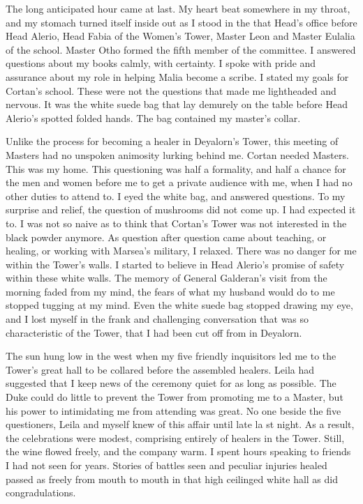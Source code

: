 \documentclass{article}
\begin{document}
\vspace{.5cm}

The long anticipated hour came at last. My heart beat somewhere in my throat, and my stomach turned itself inside out as I stood in the that Head's office before Head Alerio, Head Fabia of the Women's Tower, Master Leon and Master Eulalia of the school. Master Otho formed the fifth member of the committee. I answered questions about my books calmly, with certainty. I spoke with pride and assurance about my role in helping Malia become a scribe. I stated my goals for Cortan's school. These were not the questions that made me lightheaded and nervous. It was the white suede bag that lay demurely on the table before Head Alerio's spotted folded hands. The bag contained my master's collar. 

Unlike the process for becoming a healer in Deyalorn's Tower, this meeting of Masters had no unspoken animosity lurking behind me. Cortan needed Masters. This was my home. This questioning was half a formality, and half a chance for the men and women before me to get a private audience with me, when I had no other duties to attend to. I eyed the white bag, and answered questions. To my surprise and relief, the question of mushrooms did not come up. I had expected it to. I was not so naive as to think that Cortan's Tower was not interested in the black powder anymore. As question after question came about teaching, or healing, or working with Marsea's military, I relaxed. There was no danger for me within the Tower's walls. I started to believe in Head Alerio's promise of safety within these white walls. The memory of General Galderan's visit from the morning faded from my mind, the fears of what my husband would do to me stopped tugging at my mind. Even the white suede bag stopped drawing my eye, and I lost myself in the frank and challenging conversation that was so characteristic of the Tower, that I had been cut off from in Deyalorn. 

The sun hung low in the west when my five friendly inquisitors led me to the Tower's great hall to be collared before the assembled healers. Leila had suggested that I keep news of the ceremony quiet for as long as possible. The Duke could do little to prevent the Tower from promoting me to a Master, but his power to intimidating me from attending was great. No one beside the five questioners, Leila and myself knew of this affair until late la st night. As a result, the celebrations were modest, comprising entirely of healers in the Tower. Still, the wine flowed freely, and the company warm. I spent hours speaking to friends I had not seen for years. Stories of battles seen and peculiar injuries healed passed as freely from mouth to mouth in that high ceilinged white hall as did congradulations. 
\end{document}
